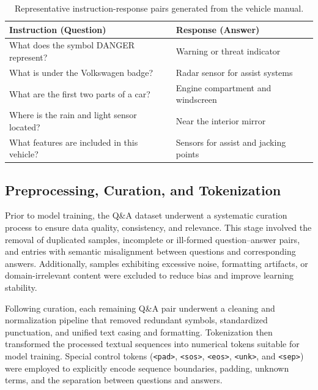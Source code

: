 \documentclass{ieeeaccess}
\begin{document}
\begin{table}[!t]
\small
\centering
\caption{Representative instruction-response pairs generated from the vehicle manual.}
\label{tab:qa_examples}

\begin{tabular*}{\textwidth}
{@{\extracolsep\fill}p{7cm} p{6cm}}
\toprule
\textbf{Instruction (Question)} & \textbf{Response (Answer)} \\
\midrule
What does the symbol DANGER represent? & Warning or threat indicator \\
What is under the Volkswagen badge? & Radar sensor for assist systems \\
What are the first two parts of a car? & Engine compartment and windscreen \\
Where is the rain and light sensor located? & Near the interior mirror \\
What features are included in this vehicle? & Sensors for assist and jacking points \\
\bottomrule
\end{tabular*}
\end{table}






\subsection{Preprocessing, Curation, and Tokenization}

Prior to model training, the Q\&A dataset underwent a systematic curation process to ensure data quality, consistency, and relevance. This stage involved the removal of duplicated samples, incomplete or ill-formed question–answer pairs, and entries with semantic misalignment between questions and corresponding answers. Additionally, samples exhibiting excessive noise, formatting artifacts, or domain-irrelevant content were excluded to reduce bias and improve learning stability.

Following curation, each remaining Q\&A pair underwent a cleaning and normalization pipeline that removed redundant symbols, standardized punctuation, and unified text casing and formatting. Tokenization then transformed the processed textual sequences into numerical tokens suitable for model training. Special control tokens (\texttt{<pad>}, \texttt{<sos>}, \texttt{<eos>}, \texttt{<unk>}, and \texttt{<sep>}) were employed to explicitly encode sequence boundaries, padding, unknown terms, and the separation between questions and answers.
\end{document}
